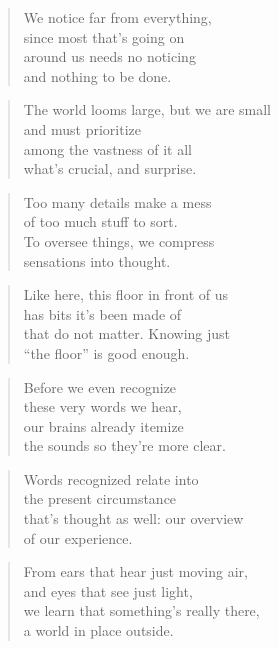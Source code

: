 \documentclass[10pt,a4paper]{article}
\begin{document}
\begin{multicols}{2}
\begin{verse}
We notice far from everything,\\
since most that’s going on\\
around us needs no noticing\\
and nothing to be done.
\end{verse}

\begin{verse}
The world looms large, but we are small\\
and must prioritize\\
among the vastness of it all\\
what’s crucial, and surprise.
\end{verse}

\begin{verse}
Too many details make a mess\\
of too much stuff to sort.\\
To oversee things, we compress\\
sensations into thought.
\end{verse}

\begin{verse}
Like here, this floor in front of us\\
has bits it’s been made of\\
that do not matter. Knowing just\\
“the floor” is good enough.
\end{verse}

\begin{verse}
Before we even recognize\\
these very words we hear,\\
our brains already itemize\\
the sounds so they’re more clear.
\end{verse}

\begin{verse}
Words recognized relate into\\
the present circumstance\\
that’s thought as well: our overview\\
of our experience.
\end{verse}

\begin{verse}
From ears that hear just moving air,\\
and eyes that see just light,\\
we learn that something’s really there,\\
a world in place outside.
\end{verse}


\end{multicols}
\end{document}
